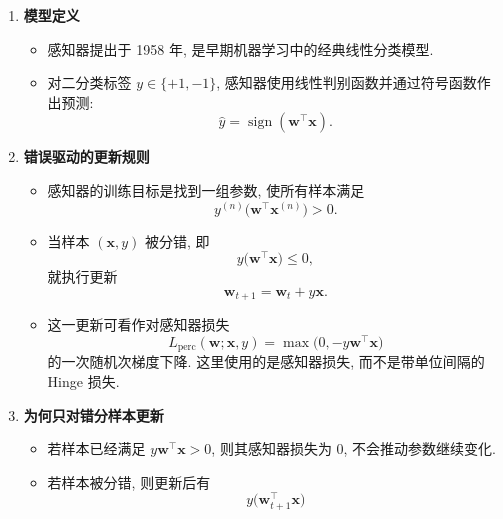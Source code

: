 \documentclass{../nndlcourse}
\begin{document}
\begin{enumerate}
    \item \textbf{模型定义}
    \begin{itemize}
        \item 感知器提出于 1958 年, 是早期机器学习中的经典线性分类模型.
        \item 对二分类标签 $y \in \{+1, -1\}$, 感知器使用线性判别函数并通过符号函数作出预测:
        \begin{equation*}
            \hat{y} = \operatorname{sign}(\boldsymbol{w}^\top \boldsymbol{x}).
        \end{equation*}
    \end{itemize}
    \item \textbf{错误驱动的更新规则}
    \begin{itemize}
        \item 感知器的训练目标是找到一组参数, 使所有样本满足
        \begin{equation*}
            y^{(n)}\bigl(\boldsymbol{w}^\top \boldsymbol{x}^{(n)}\bigr) > 0.
        \end{equation*}
        \item 当样本 $(\boldsymbol{x}, y)$ 被分错, 即
        \begin{equation*}
            y\bigl(\boldsymbol{w}^\top \boldsymbol{x}\bigr) \le 0,
        \end{equation*}
        就执行更新
        \begin{equation*}
            \boldsymbol{w}_{t+1} = \boldsymbol{w}_t + y\boldsymbol{x}.
        \end{equation*}
        \item 这一更新可看作对感知器损失
        \begin{equation*}
            L_{\mathrm{perc}}(\boldsymbol{w}; \boldsymbol{x}, y) = \max\bigl(0, -y\boldsymbol{w}^\top \boldsymbol{x}\bigr)
        \end{equation*}
        的一次随机次梯度下降. 这里使用的是感知器损失, 而不是带单位间隔的 Hinge 损失.
    \end{itemize}
    \item \textbf{为何只对错分样本更新}
    \begin{itemize}
        \item 若样本已经满足 $y\boldsymbol{w}^\top \boldsymbol{x} > 0$, 则其感知器损失为 $0$, 不会推动参数继续变化.
        \item 若样本被分错, 则更新后有
        \begin{equation*}
            y\bigl(\boldsymbol{w}_{t+1}^\top \boldsymbol{x}\bigr)

\end{equation*}
\end{itemize}
\end{enumerate}
\end{document}
